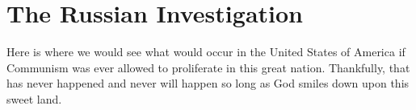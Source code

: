 \documentclass{article}
\begin{document}
\section{The Russian Investigation}

Here is where we would see what would occur in the United States of America if Communism was ever allowed to proliferate in this great nation. Thankfully, that has never happened and never will happen so long as God smiles down upon this sweet land.
\end{document}
